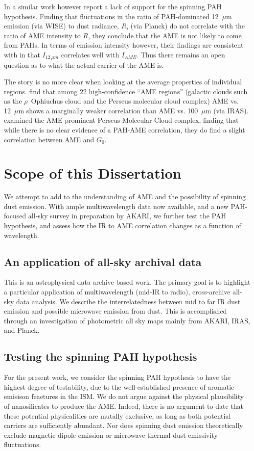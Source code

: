           In a similar work however \cite{hensley16} report a lack of support for the spinning PAH hypothesis. Finding that fluctuations in the ratio of PAH-dominated 12~$\mu$m emission (via WISE) to dust radiance, $R$, (via Planck) do not correlate with the ratio of AME intensity to $R$, they conclude that the AME is not likely to come from PAHs. In terms of emission intensity however, their findings are consistent with \cite{ysard10b} in that $I_{12~\mu{}m}$ correlates well with $I_{AME}$. Thus there remains an open question as to what the actual carrier of the AME is.

         The story is no more clear when looking at the average properties of individual regions. \cite{planckXV} find that among 22 high-confidence ``AME regions'' (galactic clouds such as the $\rho$~Ophiuchus cloud and the Perseus molecular cloud complex) AME vs. 12~$\mu$m  shows a marginally weaker correlation than AME vs. 100~$\mu$m (via IRAS). \cite{tibbs11} examined the AME-prominent Perseus Molecular Cloud complex, finding that while there is no clear evidence of a PAH-AME correlation, they do find a slight correlation between AME and  $G_{0}$.

\section{Scope of this Dissertation}

    We attempt to add to the understanding of AME and the possibility of spinning dust emission. With ample multiwavelength data now available, and a new PAH-focused all-sky survey in preparation by AKARI, we further test the PAH hypothesis, and assess how the IR to AME correlation changes as a function of wavelength.

  \subsection{An application of all-sky archival data}
    This is an astrophysical data archive based work. The primary goal is to highlight a particular application of multiwavelength (mid-IR to radio), cross-archive all-sky data analysis. We describe the interrelatedness between mid to far IR dust emission and possible microwave emission from dust. This is accomplished through an investigation of photometric all sky maps mainly from AKARI, IRAS, and Planck.

  \subsection{Testing the spinning PAH hypothesis}
    For the present work, we consider the spinning PAH hypothesis to have the highest degree of testability, due to the well-established presence of aromatic emisison feaetures in the ISM.  We do not argue against the physical plausibility of nanosilicates to produce the AME. Indeed, there is no argument to date that these potential physicalities are mutally exclusive, as long as both potential carriers are sufficiently abundant. Nor does spinning dust emission theoretically exclude magnetic dipole emission or microwave thermal dust emissivity fluctuations.

